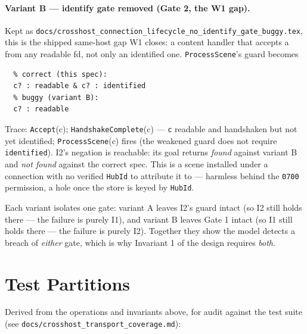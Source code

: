 \documentclass[a4paper,10pt,fleqn]{article}
\begin{document}
\paragraph{Variant B --- identify gate removed (Gate 2, the W1 gap).}
Kept as
\texttt{docs/crosshost\_connection\_lifecycle\_no\_identify\_gate\_buggy.tex},
this is the shipped same-host gap W1 closes: a content handler that
accepts a  from any readable fd, not only an identified
one.  \texttt{ProcessScene}'s guard becomes
\begin{verbatim}
  % correct (this spec):
  c? : readable & c? : identified
  % buggy (variant B):
  c? : readable
\end{verbatim}
Trace: \texttt{Accept}(c); \texttt{HandshakeComplete}(c) --- \texttt{c}
readable and handshaken but not yet identified; \texttt{ProcessScene}(c)
fires (the weakened guard does not require \texttt{identified}).  I2's
negation is reachable: its goal returns \emph{found} against variant B and
\emph{not found} against the correct spec.  This is a scene installed
under a connection with no verified \texttt{HubId} to attribute it to ---
harmless behind the \texttt{0700}  permission, a hole once
the store is keyed by \texttt{HubId}.

Each variant isolates one gate: variant A leaves I2's guard intact (so
I2 still holds there --- the failure is purely I1), and variant B leaves
Gate 1 intact (so I1 still holds there --- the failure is purely I2).
Together they show the model detects a breach of \emph{either} gate, which
is why Invariant 1 of the design requires \emph{both}.

\section{Test Partitions}
\label{sec:partitions}

Derived from the operations and invariants above, for audit against the
test suite (see \texttt{docs/crosshost\_transport\_coverage.md}):
\end{document}

